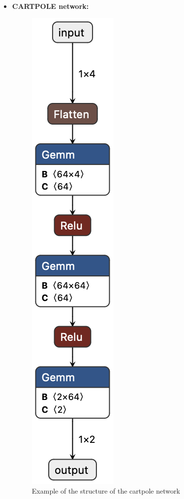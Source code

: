 \begin{itemize}
    \item \textbf{CARTPOLE network:}\\  
    \begin{figure}[]
        \caption{\label{fig:cartpole-network} Example of the structure of the cartpole network}
        \centering
        \includegraphics[scale=0.4]{"Chapter7/img/cartpole.png"}
    \end{figure}

\end{itemize}
